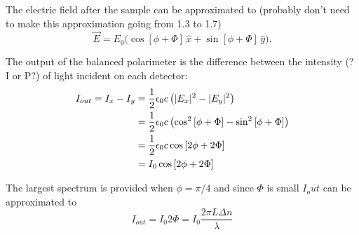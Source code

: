 The electric field after the sample can be approximated to {\color{red}(probably don't need to make this approximation going from 1.3 to 1.7)}
\begin{equation}
\vec{E} = E_0\big(\cos\left[\phi+\Phi\right]\,\hat{x}+\sin\left[\phi+\Phi\right]\,\hat{y}\big).
\end{equation}

The output of the balanced polarimeter is the difference between the intensity {\color{red}(? I or P?)} of light incident on each detector:
\begin{align}
I_{out} = I_x - I_y &= \frac{1}{2}\epsilon_0 c \left(|E_x|^2 - |E_y|^2\right)\notag\\
&= \frac{1}{2}\epsilon_0 c \left(\cos^2\left[\phi+\Phi\right] - \sin^2\left[\phi+\Phi\right]\right)\notag\\
&= \frac{1}{2}\epsilon_0 c \cos\left[2\phi+2\Phi\right]\notag\\
&= I_0 \cos\left[2\phi+2\Phi\right]
\end{align}

The largest spectrum is provided when $\phi=\pi/4$ and since $\Phi$ is small $I_out$ can be approximated to
\begin{equation}
I_{out} = I_0 2\Phi = I_0 \frac{2\pi L \Delta n}{\lambda}
\end{equation}

